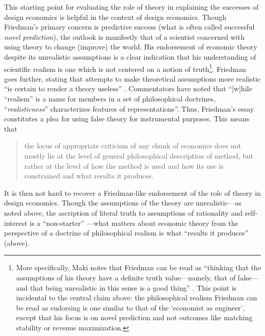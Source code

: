 This starting point for evaluating the role of theory in explaining the successes of design economics is helpful in the context of design economics. Though Friedman's primary concern is predictive success (what is often called successful \textit{novel prediction}), the outlook is manifestly that of a scientist concerned with using theory to change (improve) the world. His endorsement of economic theory despite its unrealistic assumptions is a clear indication that his understanding of scientific realism is one which is not centered on a notion of truth\footnote{More specifically, Maki notes that Friedman can be read as ``thinking that the assumptions of his theory have a definite truth value---namely, that of false---and that being unrealistic in this sense is a good thing'' \autocite*[179]{maki1992}. This point is incidental to the central claim above: the philosophical realism Friedman can be read as endorsing is one similar to that of the `economist as engineer', except that his focus is on novel prediction and not outcomes like matching stability or revenue maximization.}. Friedman goes further, stating that attempts to make theoretical assumptions more realistic ``is certain to render a theory useless'' \autocite[30]{friedman1953}. Commentators have noted that ``[w]hile ``realism'' is a name for members in a set of philosophical doctrines, ``\textit{realisticness}'' characterizes features of representations''. Thus, Friedman’s essay constitutes a plea for using false theory for instrumental purposes. This means that
\begin{quote}
    the locus of appropriate criticism of any chunk of economics does not mostly lie at the level of general philosophical description of method, but rather at the level of how the method is used and how its use is constrained and what results it produces. \autocite[33]{maki2009}
\end{quote}
\noindent It is then not hard to recover a Friedman-like endorsement of the role of theory in design economics. Though the assumptions of the theory are unrealistic---as noted above, the ascription of literal truth to assumptions of rationality and self-interest is a ``non-starter'' \autocite[328]{alexandrova2009}---what matters about economic theory from the perspective of a doctrine of philosophical realism is what ``results it produces'' (above).

